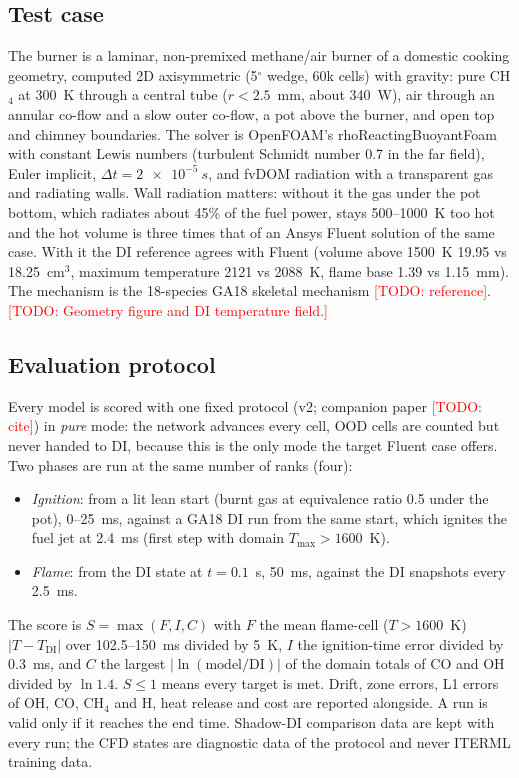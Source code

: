 \documentclass[preprint,review,12pt]{elsarticle}
\newcommand{\todo}[1]{\textcolor{red}{[TODO: #1]}}
\begin{document}
\subsection{Test case}
\label{sec:case}
The burner is a laminar, non-premixed methane/air burner of a domestic cooking geometry, computed 2D
axisymmetric (5$^\circ$ wedge, 60k cells) with gravity: pure CH$_4$ at 300~K through a central tube
($r<2.5$~mm, about 340~W), air through an annular co-flow and a slow outer co-flow, a pot above the burner,
and open top and chimney boundaries. The solver is OpenFOAM's rhoReactingBuoyantFoam with constant Lewis
numbers (turbulent Schmidt number 0.7 in the far field), Euler implicit, $\Delta t=\SI{2e-5}{s}$, and fvDOM
radiation with a transparent gas and radiating walls. Wall radiation matters: without it the gas under the
pot bottom, which radiates about 45\% of the fuel power, stays 500--1000~K too hot and the hot volume is
three times that of an Ansys Fluent solution of the same case. With it the DI reference agrees with
Fluent (volume above 1500~K 19.95 vs 18.25~cm$^3$, maximum temperature 2121 vs 2088~K, flame base 1.39 vs
1.15~mm). The mechanism is the 18-species GA18 skeletal mechanism \todo{reference}. \todo{Geometry figure and
DI temperature field.}

\subsection{Evaluation protocol}
\label{sec:protocol}
Every model is scored with one fixed protocol (v2; companion paper \todo{cite}) in \emph{pure} mode: the
network advances every cell, OOD cells are counted but never handed to DI, because this is the only mode
the target Fluent case offers. Two phases are run at the same number of ranks (four):
\begin{itemize}
\item \emph{Ignition}: from a lit lean start (burnt gas at equivalence ratio 0.5 under the pot), 0--25~ms,
  against a GA18 DI run from the same start, which ignites the fuel jet at 2.4~ms (first step with
  domain $T_\mathrm{max}>1600$~K).
\item \emph{Flame}: from the DI state at $t=0.1$~s, 50~ms, against the DI snapshots every 2.5~ms.
\end{itemize}
The score is $S=\max(F,I,C)$ with $F$ the mean flame-cell ($T>1600$~K) $|T-T_\mathrm{DI}|$ over
102.5--150~ms divided by 5~K, $I$ the ignition-time error divided by 0.3~ms, and $C$ the largest
$|\ln(\text{model/DI})|$ of the domain totals of CO and OH divided by $\ln 1.4$. $S\le1$ means every target is
met. Drift, zone errors, L1 errors of OH, CO, CH$_4$ and H, heat release and cost are reported alongside. A
run is valid only if it reaches the end time. Shadow-DI comparison data are kept with every run; the CFD
states are diagnostic data of the protocol and never ITERML training data.
\end{document}
